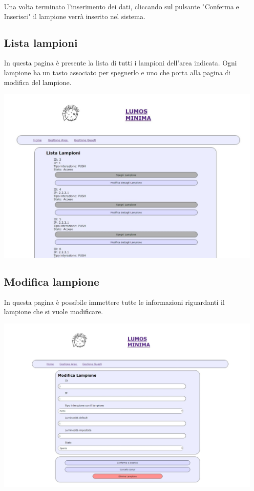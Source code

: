 \documentclass[9pt]{article}
\begin{document}
Una volta terminato l'inserimento dei dati, cliccando sul pulsante "Conferma e Inserisci"
il lampione verrà inserito nel sistema.

\subsection{Lista lampioni}
In questa pagina è presente la lista di tutti i lampioni dell'area indicata.
Ogni lampione ha un tasto associato per spegnerlo e uno che porta alla pagina di modifica del lampione.

\begin{center}
	\includegraphics[scale=0.3]{Lista_lampioni.png}
\end{center}


\subsection{Modifica lampione}
In questa pagina è possibile immettere tutte le informazioni riguardanti il lampione che si vuole modificare.

\begin{center}
	\includegraphics[scale=0.3]{Modifica_lampione.png}
\end{center}
\end{document}
